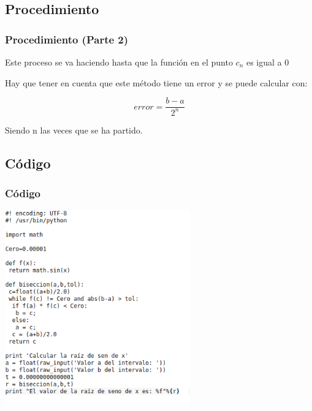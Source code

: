 \documentclass{beamer}
\begin{document}
\subsection{Procedimiento}
\begin{frame}
\frametitle{Procedimiento (Parte 2)}

 \item
  Este proceso se va haciendo hasta que la función en el punto $c_n$ es igual a $0$
 \pause
 \item
  Hay que tener en cuenta que este método tiene un error y se puede calcular con:
  \begin{center}
   $$ error=\frac{b-a}{2^n} $$ 
  \end{center} 
  Siendo n las veces que se ha partido.
 \pause

\end{frame}

\subsection{Código} 
\begin{frame}[fragile]

\frametitle{Código}
\begin{center}
\includegraphics[width=0.6\textwidth]{xcgc.png} 
\end{center}
\end{frame}

\end{document}
